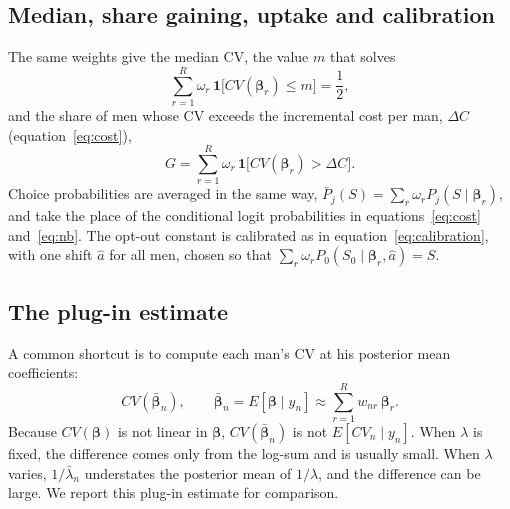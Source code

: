 \documentclass[11pt]{article}
\numberwithin{equation}{section}\numberwithin{figure}{section}\numberwithin{table}{section}
\begin{document}
\subsection{Median, share gaining, uptake and calibration}
The same weights give the median CV, the value $m$ that solves
\begin{equation}\label{eq:median}
\sum_{r=1}^{R} \omega_r\, \mathbf{1}\big[CV(\boldsymbol{\beta}_r) \le m\big] = \frac{1}{2},
\end{equation}
and the share of men whose CV exceeds the incremental cost per man, $\Delta C$ (equation~\ref{eq:cost}),
\begin{equation}\label{eq:gain}
G = \sum_{r=1}^{R} \omega_r\, \mathbf{1}\big[CV(\boldsymbol{\beta}_r) > \Delta C\big].
\end{equation}
Choice probabilities are averaged in the same way, $\bar P_j(S) = \sum_r \omega_r P_j(S \mid \boldsymbol{\beta}_r)$, and take the place of the conditional logit probabilities in equations~\ref{eq:cost} and~\ref{eq:nb}. The opt-out constant is calibrated as in equation~\ref{eq:calibration}, with one shift $\hat a$ for all men, chosen so that $\sum_r \omega_r P_0(S_0 \mid \boldsymbol{\beta}_r, \hat a) = S$.

\subsection{The plug-in estimate}
A common shortcut is to compute each man's CV at his posterior mean coefficients:
\begin{equation}\label{eq:plugin}
CV(\bar{\boldsymbol{\beta}}_n), \qquad \bar{\boldsymbol{\beta}}_n = E[\boldsymbol{\beta} \mid y_n] \approx \sum_{r=1}^{R} w_{nr}\, \boldsymbol{\beta}_r.
\end{equation}
Because $CV(\boldsymbol{\beta})$ is not linear in $\boldsymbol{\beta}$, $CV(\bar{\boldsymbol{\beta}}_n)$ is not $E[CV_n \mid y_n]$. When $\lambda$ is fixed, the difference comes only from the log-sum and is usually small. When $\lambda$ varies, $1/\bar\lambda_n$ understates the posterior mean of $1/\lambda$, and the difference can be large. We report this plug-in estimate for comparison.
\end{document}
